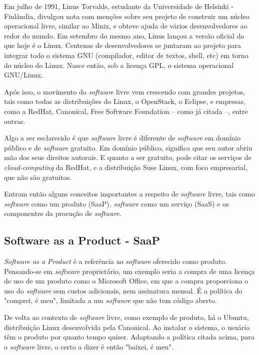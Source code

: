 \documentclass{classe_cn}                 %
\begin{document}
Em julho de 1991, Linus Torvalds, estudante da Universidade de Helsinki - Finlândia, divulgou nota com menções sobre seu projeto de construir um núcleo operacional livre, similar ao Minix, e obteve ajuda de vários desenvolvedores ao redor do mundo. Em setembro do mesmo ano, Linus lançou a versão oficial do que hoje é o Linux. Centenas de desenvolvedores se juntaram ao projeto para integrar todo o sistema GNU (compilador, editor de textos, shell, etc) em torno do núcleo do Linux. Nasce então, sob a licença GPL, o sistema operacional GNU/Linux.

Após isso, o movimento do \textit{software} livre vem crescendo com grandes projetos, tais como todas as distribuições do Linux, o OpenStack, o Eclipse, e empresas, como a RedHat, Canonical, Free Software Foundation -- como já citada --, entre outras.

Algo a ser esclarecido é que \textit{software} livre é diferente de \textit{software} em domínio público e de \textit{software} gratuito. Em domínio público, significa que seu autor abriu mão dos seus direitos autorais. E quanto a ser gratuito, pode citar os serviços de \textit{cloud-computing} da RedHat, e a distribuição Suse Linux, com foco empresarial, que não são gratuitos.

Entram então alguns conceitos importantes a respeito de \textit{software} livre, tais como \textit{software} como um produto (SaaP), \textit{software} como um serviço (SaaS) e os componentes da procução de \textit{software}.


\subsection{Software as a Product - SaaP}

\textit{Software as a Product}\cite{Gorokhova} é a referência ao \textit{software} oferecido como produto. Pensando-se em \textit{software} proprietário, um exemplo seria a compra de uma licença de uso de um produto como o Microsoft Office, em que a compra proporciona o uso do \textit{software} sem custos adicionais, nem assinatura mensal. É a política do "comprei, é meu", limitada a um \textit{software} que não tem código aberto.

De volta ao contexto de \textit{software} livre, como exemplo de produto, há o Ubuntu, distribuição Linux desenvolvida pela Canonical. Ao instalar o sistema, o usuário têm o produto por quanto tempo quiser. Adaptando a política citada acima, para o \textit{software} livre, o certo a dizer é então "baixei, é meu".
\end{document}
